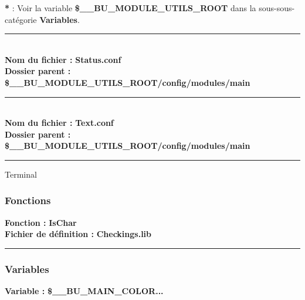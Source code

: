\documentclass[a4paper,10pt]{article}
\begin{document}
\textbf{*} : Voir la variable \textbf{\color{orange}\$\_\_BU\_MODULE\_UTILS\_ROOT\color{white}} dans la sous-sous-catégorie \textbf{\color{blue}Variables\color{white}}.\\[1\baselineskip]


\color{lime}\par\noindent\rule{\textwidth}{0.4pt}\color{white}\\[1\baselineskip]

\textbf{Nom du fichier :} \textbf{\color{lime}Status.conf\color{white}}\\[1\baselineskip]
\textbf{Dossier parent :} \textbf{\color{lime}\$\_\_BU\_MODULE\_UTILS\_ROOT/config/modules/main\color{white}}\\[1\baselineskip]



\color{lime}\par\noindent\rule{\textwidth}{0.4pt}\color{white}\\[1\baselineskip]

\textbf{Nom du fichier :} \textbf{\color{lime}Text.conf\color{white}}\\[1\baselineskip]
\textbf{Dossier parent :} \textbf{\color{lime}\$\_\_BU\_MODULE\_UTILS\_ROOT/config/modules/main\color{white}}\\[1\baselineskip]




\color{blue}\par\noindent\rule{\textwidth}{0.4pt}\color{white}

\color{blue}Terminal
\subsubsection{Fonctions}\color{white}
\textbf{Fonction :} \textbf{\color{mauve}IsChar\color{white}}\\[1\baselineskip]

\textbf{Fichier de définition :} \textbf{\color{lime}Checkings.lib\color{white}}\\[1\baselineskip]



\color{blue}\par\noindent\rule{\textwidth}{0.4pt}\color{white}

\color{blue}
\subsubsection{Variables}\color{white}
\textbf{Variable :} \textbf{\color{orange}\$\_\_BU\_MAIN\_COLOR...\color{white}}\\[1\baselineskip]
\end{document}
